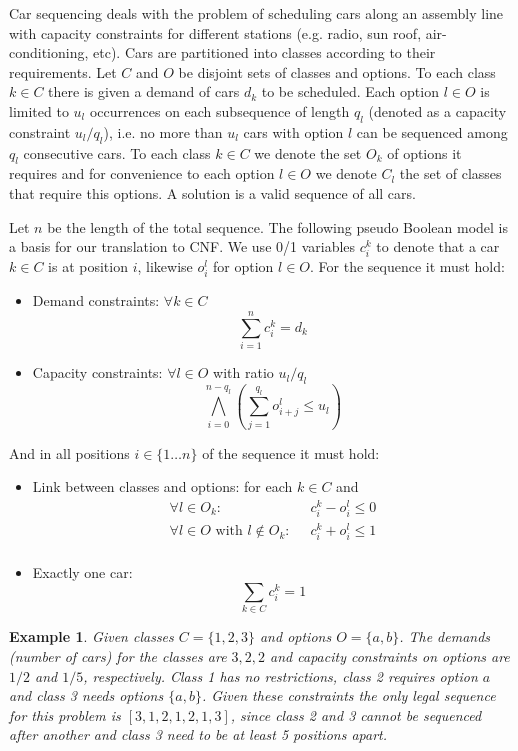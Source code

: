 \documentclass[]{easychair}
\newtheorem{example}[theorem]{Example}
\begin{document}
Car sequencing deals with the problem of scheduling cars along an assembly line with capacity constraints for different
stations (e.g. radio, sun roof, air-conditioning, etc). Cars are partitioned into classes according to their
requirements. Let $C$ and $O$ be disjoint sets of classes and options. To each class $k\in C$ there is given a demand of
cars $d_k$ to be scheduled. Each option $l\in O$ is limited to $u_l$ occurrences on each subsequence of length $q_l$
(denoted as a capacity constraint $u_l/q_l$), i.e.  no more than $u_l$ cars with option $l$ can be sequenced among $q_l$
consecutive cars. To each class $k\in C$ we denote the set $O_k$ of options it requires and for convenience to each
option $l\in O$ we denote $C_l$ the set of classes that require this options. A solution is a valid sequence of all
cars. 

Let $n$ be the length of the total sequence. The following pseudo Boolean model is a basis for our translation to CNF.
We use 0/1 variables $c^k_i$ to denote that a car $k\in C$ is at position $i$, likewise $o^l_i$ for option $l\in O$. For
the sequence it must hold: 

\begin{itemize}
    \item Demand constraints: $\forall k \in C$ $$\sum^n_{i=1} c^k_i = d_k$$                       
    \item Capacity constraints: $\forall l \in O$ with ratio $u_l/q_l$ $$\bigwedge_{i=0}^{n-q_l}(\sum_{j=1}^{q_l} o^l_{i+j} \leq u_l )$$
\end{itemize}
        And in all positions $i \in \{1\ldots n\}$ of the sequence it must hold:                                                    
\begin{itemize}
    \item Link between classes and options: for each $k\in C$ and 
        \begin{align*}
            \forall l \in O_k :\;\; & c^k_i - o^l_i \leq 0 \\
            \forall l \in O \text{ with } l \not \in O_k :\;\; &c^k_i + o^l_i \leq 1\\
        \end{align*}
    \item Exactly one car:  $$\sum_{k\in C} c^k_i = 1$$  
\end{itemize}

\begin{example} 
    Given classes $C = \{1,2,3\}$ and options $O = \{a,b\}$. The demands (number of cars) for the classes are $3,2,2$
    and capacity constraints on options are $1/2$ and $1/5$, respectively. Class 1 has no restrictions, class 2 requires
    option $a$ and class 3 needs options $\{a, b\}$. Given these constraints the only legal sequence for this problem is
    $[3,1,2,1,2,1,3]$, since class 2 and 3 cannot be sequenced after another and class 3 need to be at least 5 positions
    apart.
\end{example}                                     
\end{document}
